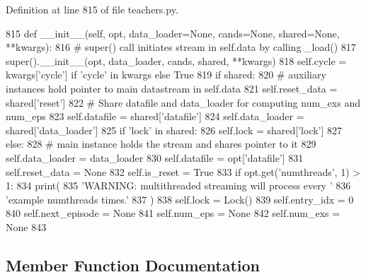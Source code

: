 Definition at line 815 of file teachers.\+py.


\begin{DoxyCode}
815     \textcolor{keyword}{def }\_\_init\_\_(self, opt, data\_loader=None, cands=None, shared=None, **kwargs):
816         \textcolor{comment}{# super() call initiates stream in self.data by calling \_load()}
817         super().\_\_init\_\_(opt, data\_loader, cands, shared, **kwargs)
818         self.cycle = kwargs[\textcolor{stringliteral}{'cycle'}] \textcolor{keywordflow}{if} \textcolor{stringliteral}{'cycle'} \textcolor{keywordflow}{in} kwargs \textcolor{keywordflow}{else} \textcolor{keyword}{True}
819         \textcolor{keywordflow}{if} shared:
820             \textcolor{comment}{# auxiliary instances hold pointer to main datastream in self.data}
821             self.reset\_data = shared[\textcolor{stringliteral}{'reset'}]
822             \textcolor{comment}{# Share datafile and data\_loader for computing num\_exs and num\_eps}
823             self.datafile = shared[\textcolor{stringliteral}{'datafile'}]
824             self.data\_loader = shared[\textcolor{stringliteral}{'data\_loader'}]
825             \textcolor{keywordflow}{if} \textcolor{stringliteral}{'lock'} \textcolor{keywordflow}{in} shared:
826                 self.lock = shared[\textcolor{stringliteral}{'lock'}]
827         \textcolor{keywordflow}{else}:
828             \textcolor{comment}{# main instance holds the stream and shares pointer to it}
829             self.data\_loader = data\_loader
830             self.datafile = opt[\textcolor{stringliteral}{'datafile'}]
831             self.reset\_data = \textcolor{keywordtype}{None}
832             self.is\_reset = \textcolor{keyword}{True}
833             \textcolor{keywordflow}{if} opt.get(\textcolor{stringliteral}{'numthreads'}, 1) > 1:
834                 print(
835                     \textcolor{stringliteral}{'WARNING: multithreaded streaming will process every '}
836                     \textcolor{stringliteral}{'example numthreads times.'}
837                 )
838                 self.lock = Lock()
839         self.entry\_idx = 0
840         self.next\_episode = \textcolor{keywordtype}{None}
841         self.num\_eps = \textcolor{keywordtype}{None}
842         self.num\_exs = \textcolor{keywordtype}{None}
843 
\end{DoxyCode}


\subsection{Member Function Documentation}
\mbox{\label{classparlai_1_1core_1_1teachers_1_1StreamDialogData_a34ba92f60661471fee4eedb5ee2b9eda}} 
